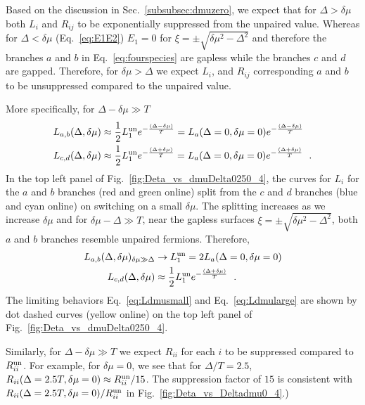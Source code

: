 \documentclass[10pt, aps, prd, superscriptaddress, nofootinbib, 
               amsmath, amssymb, twocolumn,
               preprintnumbers, showpacs,
               raggedbottom,
               floatfix]{revtex4-1}
\newcommand{\un}{{\rm{un}}}
\begin{document}
Based on the discussion in Sec.~\ref{subsubsec:dmuzero}, we expect that for
$\Delta>\delta\mu$ both $L_i$ and $R_{ij}$ to be exponentially suppressed from
the unpaired value.  Whereas for $\Delta<\delta\mu$ (Eq.~\ref{eq:E1E2}) $E_1=0$
for $\xi=\pm\sqrt{\delta\mu^2-\Delta^2}$ and therefore the branches $a$ and $b$
in Eq.~\ref{eq:fourspecies} are gapless while the branches $c$ and $d$ are
gapped. Therefore, for $\delta\mu>\Delta$ we expect $L_i$, and $R_{ij}$
corresponding $a$ and $b$ to be unsuppressed compared to the unpaired
value.

More specifically, for $\Delta-\delta\mu\gg T$
\begin{equation}
\begin{split}
L_{a,b}(\Delta,\delta\mu) &\approx \frac{1}{2}L_1^{\un} 
e^{-\frac{(\Delta-\delta\mu)}{T}}
=L_a(\Delta=0, \delta\mu=0)e^{-\frac{(\Delta-\delta\mu)}{T}}\\
L_{c,d}(\Delta,\delta\mu) &\approx \frac{1}{2}L_1^{\un}
e^{-\frac{(\Delta+\delta\mu)}{T}}
=L_a(\Delta=0,
\delta\mu=0)e^{-\frac{(\Delta+\delta\mu)}{T}}~\label{eq:Ldmusmall}\;.
\end{split}
\end{equation}
In the top left panel of Fig.~\ref{fig:Deta_vs_dmuDelta0250_4}, the curves
for $L_i$ for the $a$ and $b$ branches (red and green online) split from the
$c$ and $d$ branches (blue and cyan online) on switching on a small
$\delta\mu$. The splitting increases as we increase $\delta\mu$ and for
$\delta\mu-\Delta\gg T$, near the gapless surfaces
$\xi=\pm\sqrt{\delta\mu^2-\Delta^2}$, both $a$ and $b$ branches resemble
unpaired fermions. Therefore,
\begin{equation}
\begin{split}
L_{a,b}(\Delta,\delta\mu)_{\delta\mu\gg\Delta} &\rightarrow L_1^{\un} = 2L_a(\Delta=0, \delta\mu=0)\\
L_{c,d}(\Delta,\delta\mu) &\approx \frac{1}{2}L_1^{\un}
e^{-\frac{(\Delta+\delta\mu)}{T}}~\label{eq:Ldmularge}\;.
\end{split}
\end{equation}
The limiting behaviors Eq.~\ref{eq:Ldmusmall} and Eq.~\ref{eq:Ldmularge} are
shown by dot dashed curves (yellow online) on the top left panel of
Fig.~\ref{fig:Deta_vs_dmuDelta0250_4}.

Similarly, for $\Delta-\delta\mu\gg T$ we expect $R_{ii}$ for each $i$ to be
suppressed compared to $R^{\un}_{ii}$. For example, for $\delta\mu=0$, we see
that for $\Delta/T=2.5$, $R_{ii}(\Delta=2.5T,\delta\mu=0)\approx
R^{\un}_{ii}/15$.  The suppression factor of $15$ is consistent with
$R_{ii}(\Delta=2.5T,\delta\mu=0)/R^{\un}_{ii}$ in
Fig.~\ref{fig:Deta_vs_Deltadmu0_4}.) 
\end{document}
